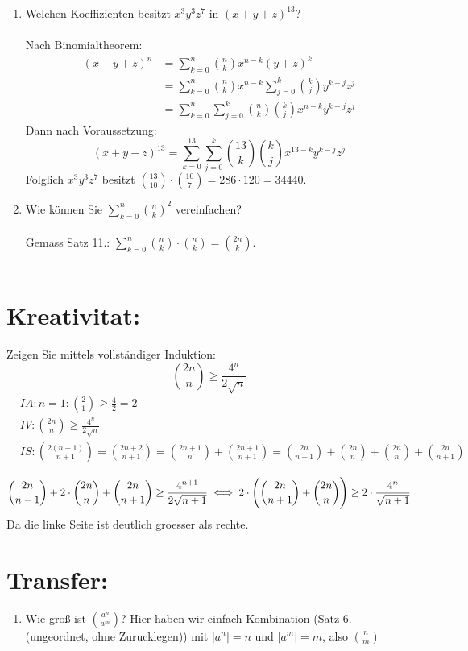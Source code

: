 \begin{enumerate}[label=(\alph*)]
        \item Welchen Koeffizienten besitzt $x^3y^3z^7$ in $(x+y+z)^{13}$?\\\\
        Nach Binomialtheorem:
        \begin{align*}
        (x+y+z)^{n} &= \sum_{k=0}^{n} \binom{n}{k}x^{n-k}(y+z)^k \\
        &= \sum_{k=0}^{n} \binom{n}{k}x^{n-k}\sum_{j=0}^{k}\binom{k}{j}y^{k-j}z^j \\
        &= \sum_{k=0}^{n}\sum_{j=0}^{k} \binom{n}{k}\binom{k}{j}x^{n-k}y^{k-j}z^j
        \end{align*}
        Dann nach Voraussetzung: 
        \[(x+y+z)^{13} = \sum_{k=0}^{13}\sum_{j=0}^{k} \binom{13}{k}\binom{k}{j}x^{13-k}y^{k-j}z^j\]
        Folglich $x^3y^3z^7$ besitzt $\binom{13}{10}\cdot\binom{10}{7} = 286 \cdot 120 = 34440$.

        \item Wie können Sie $\sum_{k=0}^n \binom{n}{k}^2$ vereinfachen?\\\\
        Gemass Satz 11.: $\sum_{k=0}^n \binom{n}{k}\cdot\binom{n}{k} = \binom{2n}{k}$.\\\\
    \end{enumerate}
    
    \section*{Kreativitat:} 
    Zeigen Sie mittels vollständiger Induktion:
    \[\binom{2n}{n}\geq \frac{4^n}{2\sqrt n}\]
    \begin{align*}
            &IA: n=1: \binom{2}{1}\geq \frac{4}{2} = 2\\ %
            &IV: \binom{2n}{n}\geq \frac{4^n}{2\sqrt n}\\
            &IS: \binom{2(n+1)}{n+1}=\binom{2n+2}{n+1}
            = \binom{2n+1}{n} + \binom{2n+1}{n+1}
            = \binom{2n}{n-1} + \binom{2n}{n} + \binom{2n}{n} + \binom{2n}{n+1}\\
    \end{align*}
    \[\binom{2n}{n-1} + 2\cdot\binom{2n}{n} + \binom{2n}{n+1} \geq \frac{4^{n+1}}{2\sqrt {n+1}}\\
            \iff 2\cdot\Bigg(\binom{2n}{n+1} + \binom{2n}{n}\Bigg) \geq 2\cdot\frac{4^n}{\sqrt {n+1}}\\\]
            Da die linke Seite ist deutlich groesser als rechte.
    \section*{Transfer:}
    \begin{enumerate}[label=(\alph*)]
    \item Wie groß ist $\binom{a^n}{a^m}$?
    Hier haben wir einfach Kombination (Satz 6. (ungeordnet, ohne Zurucklegen)) mit $|a^n| = n$ und 
    $|a^m| = m$, also $\binom{n}{m}$
    \end{enumerate} 
